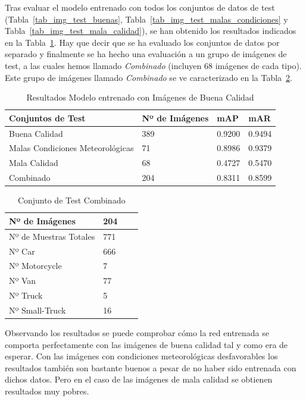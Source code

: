 Tras evaluar el modelo entrenado con todos los conjuntos de datos de test (Tabla~\ref{tab_img_test_buenas}, Tabla~\ref{tab_img_test_malas_condiciones} y Tabla~\ref{tab_img_test_mala_calidad}),  se han obtenido los resultados indicados en la Tabla~\ref{resultados_test_buenas}. Hay que decir que se ha evaluado los conjuntos de datos por separado y finalmente se ha hecho una evaluación a un grupo de imágenes de test, a las cuales hemos llamado \textit{Combinado} (incluyen 68 imágenes de cada tipo). Este grupo de imágenes llamado \textit{Combinado} se ve caracterizado en la Tabla~\ref{test_combinado}.

\begin{table}[H] 
\begin{center}
\begin{tabular}{|l|l|l|l|}
\hline
 Conjuntos de Test & Nº de Imágenes & mAP & mAR  \\ 
\hline \hline
Buena Calidad & 389 & 0.9200 & 0.9494 \\ \hline
Malas Condiciones Meteorológicas & 71 & 0.8986 & 0.9379 \\ \hline
Mala Calidad  & 68 & 0.4727 & 0.5470\\ \hline
Combinado & 204 & 0.8311 & 0.8599\\ \hline
\end{tabular}
\caption{Resultados Modelo entrenado con Imágenes de Buena Calidad}
\label{resultados_test_buenas}
\end{center}
\end{table}

\begin{table}[H] 
\begin{center}
\begin{tabular}{|l|l|l|l|}
\hline
Nº de Imágenes  & 204 \\
\hline \hline
Nº de Muestras Totales & 771\\ \hline
Nº Car & 666 \\ \hline
Nº Motorcycle & 7 \\ \hline
Nº Van & 77 \\ \hline
Nº Truck & 5 \\ \hline
Nº Small-Truck & 16 \\ \hline
\end{tabular}
\caption{Conjunto de Test Combinado}
\label{test_combinado}
\end{center}
\end{table}

Observando los resultados se puede comprobar cómo la red entrenada se comporta perfectamente con las imágenes de buena calidad tal y como era de esperar. Con las imágenes con condiciones meteorológicas desfavorables los resultados también son bastante buenos a pesar de no haber sido entrenada con dichos datos.  Pero en el caso de las imágenes de mala calidad se obtienen resultados muy pobres.

